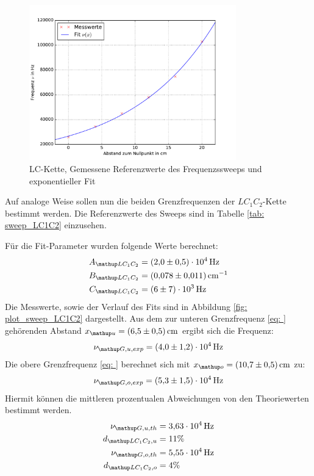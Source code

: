 \begin{figure}
  \centering
  \includegraphics[width = 0.8\textwidth]{../Messdaten/plots/frequenzsweep_LC.pdf}
  \caption{LC-Kette, Gemessene Referenzwerte des Frequenzssweeps und exponentieller Fit}
  \label{fig: plot_sweep_LC}
\end{figure}
Auf analoge Weise sollen nun die beiden Grenzfrequenzen der $LC_1C_2$-Kette bestimmt werden. Die Referenzwerte
des Sweeps sind in Tabelle \ref{tab: sweep_LC1C2} einzusehen.
\FloatBarrier

Für die Fit-Parameter wurden folgende Werte berechnet:
\begin{align}
  \begin{aligned}
    A\ua{LC_1C_2} &= \SI{2.0(5)e4}{\hertz}\\
    B\ua{LC_1C_2} &= \SI{0.078(11)}{\cm^{-1}}\\
    C\ua{LC_1C_2} &= \SI{6(7)e3}{\hertz}
  \end{aligned}
  \label{eq: params_LC1C2}
\end{align}
Die Messwerte, sowie der Verlauf des Fits sind in Abbildung \ref{fig: plot_sweep_LC1C2} dargestellt.
Aus dem zur unteren Grenzfrequenz \eqref{eq: } gehörenden Abstand $x\ua{u} = \SI{6.5(5)}{\cm}$ ergibt sich die Frequenz:
\begin{equation}
  \nu\ua{G, u, exp} = \SI{4.0(12)e4}{\hertz}
\end{equation}
Die obere Grenzfrequenz \eqref{eq: } berechnet sich mit $x\ua{o} = \SI{10.7(5)}{\cm}$ zu:
\begin{equation}
    \nu\ua{G, o, exp} = \SI{5.3(15)e4}{\hertz}
\end{equation}
Hiermit können die mittleren prozentualen Abweichungen von den Theoriewerten bestimmt werden.
\begin{align}
  \nu\ua{G,u,th} &= \SI{3.63e4}{\hertz}\\
  d\ua{LC_1C_2,u} &= 11 \%\\
  \nu\ua{G,o,th} &= \SI{5.55e4}{\hertz}\\
  d\ua{LC_1C_2, o} &= 4 \%
\end{align}
